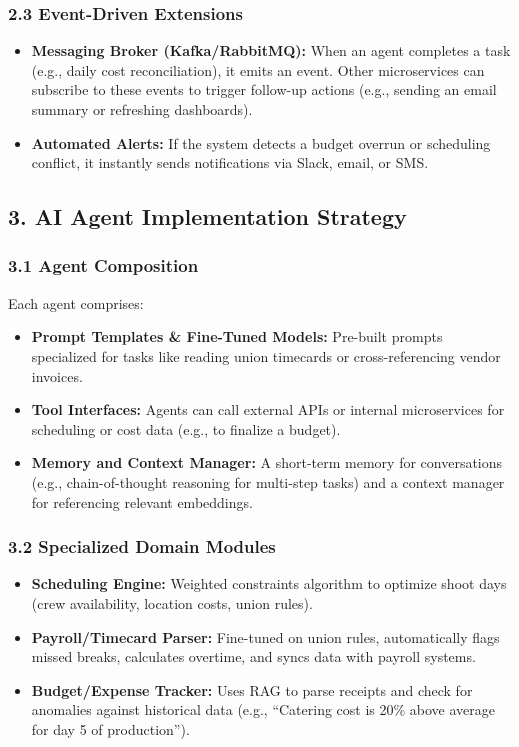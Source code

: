 \documentclass[11pt]{article}
\begin{document}
\subsubsection{2.3 Event-Driven Extensions}
\begin{itemize}
    \item \textbf{Messaging Broker (Kafka/RabbitMQ):} When an agent completes a task (e.g., daily cost reconciliation), it emits an event. Other microservices can subscribe to these events to trigger follow-up actions (e.g., sending an email summary or refreshing dashboards).
    \item \textbf{Automated Alerts:} If the system detects a budget overrun or scheduling conflict, it instantly sends notifications via Slack, email, or SMS.
\end{itemize}

\subsection{3. AI Agent Implementation Strategy}
\subsubsection{3.1 Agent Composition}
Each agent comprises:
\begin{itemize}
    \item \textbf{Prompt Templates \& Fine-Tuned Models:} Pre-built prompts specialized for tasks like reading union timecards or cross-referencing vendor invoices.
    \item \textbf{Tool Interfaces:} Agents can call external APIs or internal microservices for scheduling or cost data (e.g., to finalize a budget).
    \item \textbf{Memory and Context Manager:} A short-term memory for conversations (e.g., chain-of-thought reasoning for multi-step tasks) and a context manager for referencing relevant embeddings.
\end{itemize}

\subsubsection{3.2 Specialized Domain Modules}
\begin{itemize}
    \item \textbf{Scheduling Engine:} Weighted constraints algorithm to optimize shoot days (crew availability, location costs, union rules).
    \item \textbf{Payroll/Timecard Parser:} Fine-tuned on union rules, automatically flags missed breaks, calculates overtime, and syncs data with payroll systems.
    \item \textbf{Budget/Expense Tracker:} Uses RAG to parse receipts and check for anomalies against historical data (e.g., “Catering cost is 20\% above average for day 5 of production”).
\end{itemize}
\end{document}
